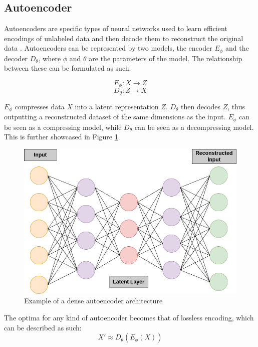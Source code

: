 \subsection{Autoencoder}

Autoencoders are specific types of neural networks used to learn efficient encodings of unlabeled data and then decode them to reconstruct the original data \cite{10.5555/104279.104293, bank2021autoencoders}. Autoencoders can be represented by two models, the encoder $E_\phi$ and the decoder $D_\theta$, where $\phi$ and $\theta$ are the parameters of the model. The relationship between these can be formulated as such: 

\begin{equation}\label{eq:enc}
E_\phi: X \rightarrow Z 
\end{equation}
\begin{equation}\label{eq:dec}
D_\theta: Z \rightarrow X
\end{equation}

$E_\phi$ compresses data $X$ into a latent representation $Z$. $D_\theta$ then decodes $Z$, thus outputting a reconstructed dataset of the same dimensions as the input. $E_\phi$ can be seen as a compressing model, while $D_\theta$ can be seen as a decompressing model. This is further showcased in Figure \ref{fig:aediagram}. 

\begin{figure}[!h]
    \centering
    \includegraphics[scale=0.4]{figures/ae.png}
    \caption{Example of a dense autoencoder architecture}
    \label{fig:aediagram}
\end{figure}

The optima for any kind of autoencoder becomes that of lossless encoding, which can be described as such:
\begin{equation}
    X' \approx D_\theta(E_\phi(X))
\end{equation}

